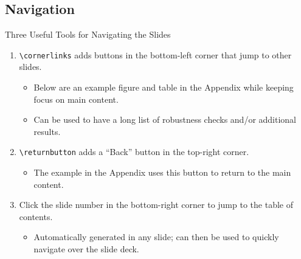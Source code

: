 
\subsection{Navigation}

\begin{frame}{Three Useful Tools for Navigating the Slides}
\label{slide:cornerlinks}

\begin{enumerate}
\item \texttt{\textbackslash cornerlinks} adds buttons in the bottom-left corner that jump to other slides.
\begin{itemize}
\item Below are an example figure and table in the Appendix while keeping focus on main content.
\item Can be used to have a long list of robustness checks and/or additional results.
\end{itemize} \vspace{1em}
\item \texttt{\textbackslash returnbutton} adds a ``Back'' button in the top-right corner.
\begin{itemize}
\item The example in the Appendix uses this button to return to the main content.
\end{itemize} \vspace{1em}
\item Click the slide number in the bottom-right corner to jump to the table of contents.
\begin{itemize}
\item Automatically generated in any slide; can then be used to quickly navigate over the slide deck.
\end{itemize}
\end{enumerate}



\end{frame}
